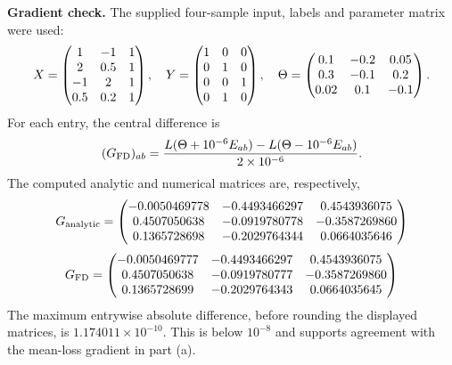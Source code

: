 \textbf{Gradient check.} The supplied four-sample input, labels and parameter matrix were used:
\[
X=\begin{pmatrix}1&-1&1\\2&0.5&1\\-1&2&1\\0.5&0.2&1\end{pmatrix},\quad
Y=\begin{pmatrix}1&0&0\\0&1&0\\0&0&1\\0&1&0\end{pmatrix},\quad
\Theta=\begin{pmatrix}0.1&-0.2&0.05\\0.3&-0.1&0.2\\0.02&0.1&-0.1\end{pmatrix}.
\]
For each entry, the central difference is
\[
(G_{\rm FD})_{ab}=\frac{L(\Theta+10^{-6}E_{ab})-L(\Theta-10^{-6}E_{ab})}{2\times10^{-6}}.
\]
The computed analytic and numerical matrices are, respectively,
\[G_{\rm analytic}=\begin{pmatrix}-0.0050469778 & -0.4493466297 & 0.4543936075\\0.4507050638 & -0.0919780778 & -0.3587269860\\0.1365728698 & -0.2029764344 & 0.0664035646\end{pmatrix}\]
\[G_{\rm FD}=\begin{pmatrix}-0.0050469777 & -0.4493466297 & 0.4543936075\\0.4507050638 & -0.0919780777 & -0.3587269860\\0.1365728699 & -0.2029764343 & 0.0664035645\end{pmatrix}\]
The maximum entrywise absolute difference, before rounding the displayed matrices, is $1.174011\times10^{-10}$. This is below $10^{-8}$ and supports agreement with the mean-loss gradient in part (a).

